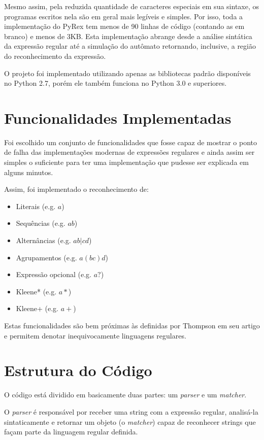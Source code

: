 \documentclass[a4paper,12pt,oneside,onecolumn]{uerj}
\begin{document}
Mesmo assim, pela reduzida quantidade de caracteres especiais em sua sintaxe, os programas escritos nela são em geral mais legíveis e simples. Por isso, toda a implementação do PyRex tem menos de 90 linhas de código (contando as em branco) e menos de 3KB. Esta implementação abrange desde a análise sintática da expressão regular até a simulação do autômato retornando, inclusive, a região do reconhecimento da expressão.

O projeto foi implementado utilizando apenas as bibliotecas padrão disponíveis no Python 2.7, porém ele também funciona no Python 3.0 e superiores.

\section{Funcionalidades Implementadas}

Foi escolhido um conjunto de funcionalidades que fosse capaz de mostrar o ponto de falha das implementações modernas de expressões regulares e ainda assim ser simples o suficiente para ter uma implementação que pudesse ser explicada em alguns minutos.

Assim, foi implementado o reconhecimento de:

\begin{itemize}
    \item Literais (e.g. $a$)
    \item Sequências (e.g. $ab$)
    \item Alternâncias (e.g. $ab|cd$)
    \item Agrupamentos (e.g. $a(bc)d$)
    \item Expressão opcional (e.g. $a?$)
    \item Kleene* (e.g. $a*$)
    \item Kleene+ (e.g. $a+$)
\end{itemize}

Estas funcionalidades são bem próximas às definidas por Thompson \cite{bib:Thompson68} em seu artigo e permitem denotar inequivocamente linguagens regulares.

\section{Estrutura do Código}

O código está dividido em basicamente duas partes: um \emph{parser} e um \emph{matcher}.

O \emph{parser} é responsável por receber uma string com a expressão regular, analisá-la sintaticamente e retornar um objeto (o \emph{matcher}) capaz de reconhecer strings que façam parte da linguagem regular definida.
\end{document}

